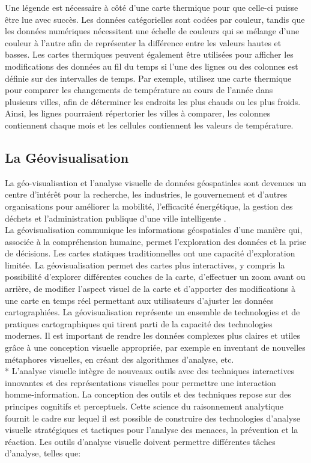 \documentclass[french, a4paper, 12pt]{report}
\begin{document}
Une légende est nécessaire à côté d’une carte thermique pour que celle-ci puisse être lue avec succès. Les données catégorielles sont codées par couleur, tandis que les données numériques nécessitent une échelle de couleurs qui se mélange d'une couleur à l'autre afin de représenter la différence entre les valeurs hautes et basses. 
Les cartes thermiques peuvent également être utilisées pour afficher les modifications des données au fil du temps si l'une des lignes ou des colonnes est définie sur des intervalles de temps. Par exemple, utilisez une carte thermique pour comparer les changements de température au cours de l’année dans plusieurs villes, afin de déterminer les endroits les plus chauds ou les plus froids. Ainsi, les lignes pourraient répertorier les villes à comparer, les colonnes contiennent chaque mois et les cellules contiennent les valeurs de température.

\subsection{La Géovisualisation}
La géo-visualisation et l'analyse visuelle de données géospatiales sont devenues un centre d'intérêt pour la recherche, les industries, le gouvernement et d'autres organisations pour améliorer la mobilité, l'efficacité énergétique, la gestion des déchets et l'administration publique d'une ville intelligente \cite{12}.\\

La géovisualisation communique les informations géospatiales d'une manière qui, associée à la compréhension humaine, permet l'exploration des données et la prise de décisions. Les cartes statiques traditionnelles ont une capacité d'exploration limitée. La géovisualisation permet des cartes plus interactives, y compris la possibilité d'explorer différentes couches de la carte, d'effectuer un zoom avant ou arrière, de modifier l'aspect visuel de la carte et d’apporter des modifications à une carte en temps réel permettant aux utilisateurs d’ajuster les données cartographiées. La géovisualisation représente un ensemble de technologies et de pratiques cartographiques qui tirent parti de la capacité des technologies modernes. Il est important de rendre les données complexes plus claires et utiles grâce à une conception visuelle appropriée, par exemple en inventant de nouvelles métaphores visuelles, en créant des algorithmes d'analyse, etc. \\*
L'analyse visuelle intègre de nouveaux outils avec des techniques interactives innovantes et des représentations visuelles pour permettre une interaction homme-information. La conception des outils et des techniques repose sur des principes cognitifs et perceptuels. Cette science du raisonnement analytique fournit le cadre sur lequel il est possible de construire des technologies d'analyse visuelle stratégiques et tactiques pour l'analyse des menaces, la prévention et la réaction.
Les outils d'analyse visuelle doivent permettre différentes tâches d'analyse, telles que:
\end{document}
